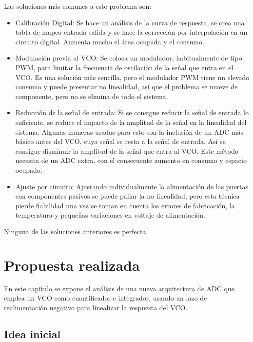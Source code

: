 \documentclass[12pt]{report} %
\begin{document}
	Las soluciones más comunes a este problema son:
	
	\begin{itemize}
		\item Calibración Digital: Se hace un análisis de la curva de respuesta, se crea una tabla de mapeo entrada-salida y se hace la corrección por interpolación en un circuito digital. Aumenta mucho el área ocupada y el consumo.
		
		\item Modulación previa al VCO: Se coloca un modulador, habitualmente de tipo PWM, para limitar la frecuencia de oscilación de la señal que entra en el VCO. Es una solución más sencilla, pero el modulador PWM tiene un elevado consumo y puede presentar no linealidad, así que el problema se mueve de componente, pero no se elimina de todo el sistema.
		
		\item Reducción de la señal de entrada: Si se consigue reducir la señal de entrada lo suficiente, se reduce el impacto de la amplitud de la señal en la linealidad del sistema. Algunas maneras usadas para esto son la inclusión de un ADC más básico antes del VCO, cuya señal se resta a la señal de entrada. Así se consigue disminuir la amplitud de la señal que entra al VCO. Este método necesita de un ADC extra, con el consecuente aumento en consumo y espacio ocupado.
		
		\item Ajuste por circuito: Ajustando individualmente la alimentación de las puertas con componentes pasivos se puede paliar la no linealidad, pero esta técnica pierde fiabilidad una vez se toman en cuenta los errores de fabricación, la temperatura y pequeñas variaciones en voltaje de alimentación.
	\end{itemize}
	
	Ninguna de las soluciones anteriores es perfecta.
	
\chapter{Propuesta realizada}
	
	En este capítulo se expone el análisis de una nueva arquitectura de ADC que emplea un VCO como cuantificador e integrador, usando un lazo de realimentación negativo para linealizar la respuesta del VCO.
	
	\section{Idea inicial}\label{sc:initial-idea}
	
\end{document}
